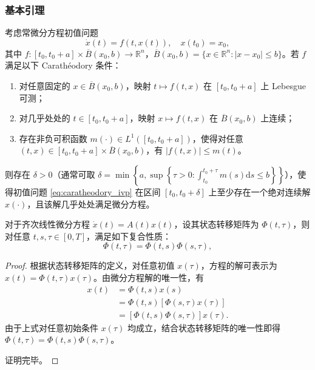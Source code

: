 \documentclass{GZUbachelorthesis}
\begin{document}
\subsubsection*{基本引理}
\vspace{1em}
\begin{lem}\label{lem:caratheodory}
	考虑常微分方程初值问题
	\begin{equation}\label{eq:caratheodory_ivp}
		\dot{x}(t) = f(t, x(t)), \quad x(t_0) = x_0,
	\end{equation}
	其中 $f: [t_0, t_0 + a] \times \overline{B}(x_0, b) \to \mathbb{R}^n$，$\overline{B}(x_0, b) = \{x \in \mathbb{R}^n : |x - x_0| \leq b\}$。若 $f$ 满足以下 Carathéodory 条件：
	\begin{enumerate}[label=(\roman*)]
		\item 对任意固定的 $x \in \overline{B}(x_0, b)$，映射 $t \mapsto f(t, x)$ 在 $[t_0, t_0 + a]$ 上 Lebesgue 可测；
		\item 对几乎处处的 $t \in [t_0, t_0 + a]$，映射 $x \mapsto f(t, x)$ 在 $\overline{B}(x_0, b)$ 上连续；
		\item 存在非负可积函数 $m(\cdot) \in L^1([t_0, t_0 + a])$，使得对任意 $(t, x) \in [t_0, t_0 + a] \times \overline{B}(x_0, b)$，有 $|f(t, x)| \leq m(t)$。
	\end{enumerate}
	则存在 $\delta > 0$（通常可取 $\delta = \min\left\{a, \sup\left\{\tau > 0 : \int_{t_0}^{t_0+\tau} m(s) \mathrm{d}s \leq b\right\}\right\}$），使得初值问题 \eqref{eq:caratheodory_ivp} 在区间 $[t_0, t_0 + \delta]$ 上至少存在一个绝对连续解 $x(\cdot)$，且该解几乎处处满足微分方程。
\end{lem}
\vspace{1em}
\begin{lem}\label{lem2.2.3}
	对于齐次线性微分方程 $\dot{x}(t) = A(t)x(t)$，设其状态转移矩阵为 $\Phi(t, \tau)$，则对任意 $t, s, \tau \in [0, T]$，满足如下复合性质：
	\begin{equation}\label{2.32}
		\Phi(t, \tau) = \Phi(t, s)\Phi(s, \tau),
	\end{equation}
\end{lem}
\begin{proof}
	根据状态转移矩阵的定义，对任意初值 $x(\tau)$，方程的解可表示为 $x(t) = \Phi(t, \tau)x(\tau)$。由微分方程解的唯一性，有
	\begin{equation}\label{2.33}
		\begin{aligned}
			x(t) &= \Phi(t, s)x(s) \\
			&= \Phi(t, s)[\Phi(s, \tau)x(\tau)] \\
			&= [\Phi(t, s)\Phi(s, \tau)]x(\tau).
		\end{aligned}
	\end{equation}
	由于上式对任意初始条件 $x(\tau)$ 均成立，结合状态转移矩阵的唯一性即得 $\Phi(t, \tau) = \Phi(t, s)\Phi(s, \tau)$。\par
	证明完毕。
\end{proof}
\end{document}
